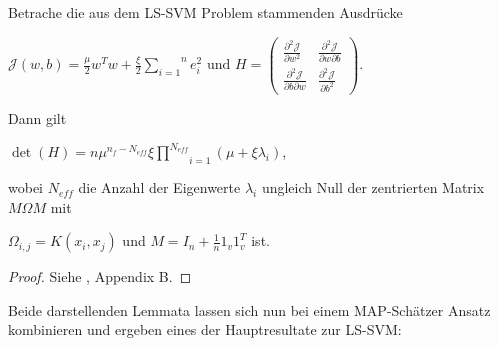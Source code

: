 \begin{lemma}
Betrache die aus dem LS-SVM Problem stammenden Ausdrücke 
\begin{center}
	$\mathcal{J}(w,b) = \frac{\mu}{2}w^T w + \frac{\xi}{2}\overset{n}{\underset{i=1}			{\sum}} e_i ^2 \text{ und } H = \begin{pmatrix}
	\frac{\partial^2 \mathcal{J}}{\partial w^2 } & \frac{\partial^2 \mathcal{J}}				{\partial w \partial b } \\
	\frac{\partial^2 \mathcal{J}}{\partial b \partial w } & \frac{\partial^2 					\mathcal{J}}{\partial b^2 }
	\end{pmatrix}.$
\end{center}

Dann gilt

\begin{center}
	$\det(H) = n \mu^{n_f - N_{eff}} \xi \underset{i=1}{\overset{N_{eff}}{\prod}}(\mu + 			\xi \lambda_i)$,
\end{center}

wobei $N_{eff}$ die Anzahl der Eigenwerte $\lambda_i$ ungleich Null der zentrierten Matrix $M \Omega M$ mit
\begin{center}
	$\Omega_{i,j} = K(x_i, x_j)$ und $M = I_n + \frac{1}{n} 1_v 1_v^T$ ist.
\end{center}
\end{lemma}

\begin{proof}
Siehe \cite{LS-SVM}, Appendix B.
\end{proof}

Beide darstellenden Lemmata lassen sich nun bei einem MAP-Schätzer Ansatz kombinieren und ergeben eines der Hauptresultate zur LS-SVM:


